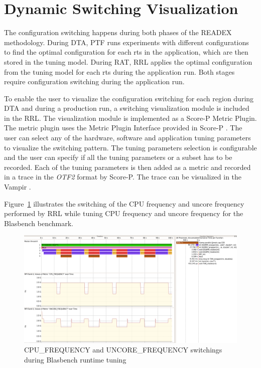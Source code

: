 \section{Dynamic Switching Visualization} \label{switching-visualization}
The configuration switching happens during both phases of the READEX methodology. 
During DTA, PTF runs experiments with different configurations to find the optimal configuration for each rts in the application, which are then stored in the tuning model. During RAT, RRL applies the optimal configuration from the tuning model for each rts during the application run. Both stages require configuration switching during the application run.

To enable the user to visualize the configuration switching for each region during DTA and during a production run, a switching visualization module is included in the RRL. 
The visualization module is implemented as a Score-P Metric Plugin. The metric plugin uses the Metric Plugin Interface provided in Score-P \cite{Schoene2017}. The user can select any of the hardware, software and application tuning parameters to visualize the switching pattern. The tuning parameters selection is configurable and the user can specify if all the tuning parameters or a subset has to be recorded. Each of the tuning parameters is then added as a metric and recorded in a trace in the \textit{OTF2} format \cite{Ilsche-Cstate} by Score-P. The trace can be visualized in the Vampir \cite{BHJR:10:VampirOverview}. 
 
Figure~\ref{fig:switch_visualization} illustrates the switching of the CPU frequency and uncore frequency performed by RRL while tuning CPU frequency and uncore frequency for the Blasbench benchmark. 
\begin{figure}[!t]
\centering
\includegraphics[width=.95\columnwidth]{figures/visualization_trace.png}
\caption{{CPU\_FREQUENCY} and {UNCORE\_FREQUENCY} switchings during Blasbench runtime tuning}
\label{fig:switch_visualization}
\end{figure}

 